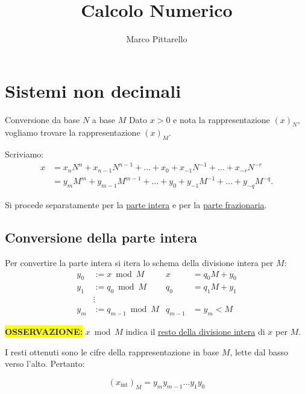 \documentclass{article}
\title{Calcolo Numerico}
\author{Marco Pittarello}
\date{}
\begin{document}
\maketitle
\tableofcontents
\newpage

\section{Sistemi non decimali}

\begin{defi}{Conversione da base $N$ a base $M$}{}
    Dato $x>0$ e nota la rappresentazione $(x)_N$, vogliamo trovare la rappresentazione $(x)_M$.

    Scriviamo:
    \begin{align*}
        x
         & =x_nN^n+x_{n-1}N^{n-1}+\dots+x_0
        +x_{-1}N^{-1}+\dots+x_{-r}N^{-r}    \\
         & =y_mM^m+y_{m-1}M^{m-1}+\dots+y_0
        +y_{-1}M^{-1}+\dots+y_{-q}M^{-q}.
    \end{align*}

    Si procede separatamente per la \underline{parte intera} e per la \underline{parte frazionaria}.
\end{defi}

\subsection{Conversione della parte intera}

Per convertire la parte intera si itera lo schema della divisione intera per $M$:
\begin{align*}
    y_0     & :=x\bmod M
            &
    x       & =q_0M+y_0        \\
    y_1     & :=q_0\bmod M
            &
    q_0     & =q_1M+y_1        \\
            & \vdots           \\
    y_m     & :=q_{m-1}\bmod M
            &
    q_{m-1} & =y_m<M
\end{align*}

\colorbox{yellow}{\textbf{OSSERVAZIONE:}}
$x\bmod M$ indica il \underline{resto della divisione intera} di $x$ per $M$.

I resti ottenuti sono le cifre della rappresentazione in base $M$, lette dal basso verso l'alto. Pertanto:

$$
    (x_{\mathrm{int}})_M
    =
    y_my_{m-1}\dots y_1y_0
$$
\end{document}
